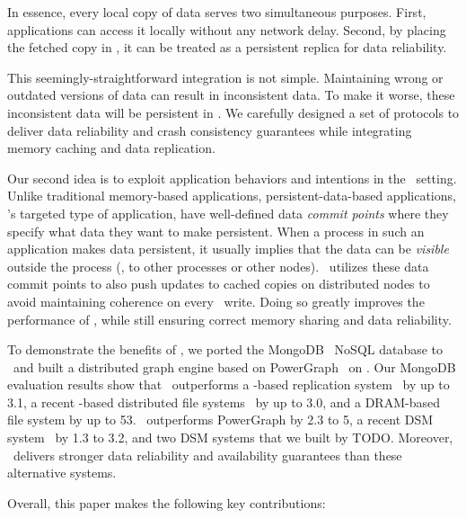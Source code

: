 In essence, every local copy of data serves two simultaneous purposes.
First, applications can access it locally without any network delay.
Second, by placing the fetched copy in \nvm, it can be treated as a persistent replica 
for data reliability.

This seemingly-straightforward integration is not simple. 
Maintaining wrong or outdated versions of data can result in inconsistent data.
To make it worse, these inconsistent data will be persistent in \nvm.
We carefully designed a set of protocols to deliver data reliability and crash consistency guarantees 
while integrating memory caching and data replication.

Our second idea is to exploit application behaviors and intentions in the \dsnvm\ setting. 
Unlike traditional memory-based applications, persistent-data-based applications,
\dsnvm's targeted type of application, have well-defined data {\em commit points}
where they specify what data they want to make persistent.
When a process in such an application makes data persistent,
it usually implies that the data can be {\em visible} outside the process (\eg, to other processes or other nodes). 
\hotpot\ utilizes these data commit points to also push updates to cached copies on distributed nodes
to avoid maintaining coherence on every \nvm\ write. %
Doing so greatly improves the performance of \hotpot, 
while still ensuring correct memory sharing and data reliability.

To demonstrate the benefits of \hotpot, we ported the MongoDB~\cite{MongoDB} NoSQL database to \hotpot\
and built a distributed graph engine based on PowerGraph~\cite{Gonzalez12-OSDI} on \hotpot. 
Our MongoDB evaluation results show that \hotpot\ outperforms a \nvm-based replication system~\cite{Zhang15-Mojim} by up to 3.1\x{}, 
a recent \nvm-based distributed file systems~\cite{Octopus} by up to 3.0\x{}, and a DRAM-based file system by up to 53\x{}. 
\hotpot\ outperforms PowerGraph by 2.3\x{} to 5\x{}, a recent DSM system~\cite{Nelson15-ATC} by 1.3\x{} to 3.2\x{},
and two DSM systems that we built by TODO.
Moreover, \hotpot\ delivers stronger data reliability and availability guarantees than these alternative systems.

Overall, this paper makes the following key contributions:

